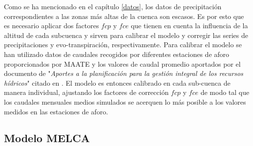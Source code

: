 Como se ha mencionado en el capítulo \ref{datos}, los datos de precipitación correspondientes a las zonas más 
altas de la cuenca son escasos. Es por esto que es necesario aplicar  dos factores $fcp$ y $fce$ 
que tienen en cuenta la influencia de la altitud de cada subcuenca y
 sirven para calibrar el modelo y corregir las series de precipitaciones y evo-transpiración, respectivamente.
 Para calibrar el modelo se han utilizado datos de caudales recogidos por diferentes estaciones de aforo proporcionados por
 MAATE \cite{MAATE} y los valores de caudal promedio aportados por el documento de "\textit{Aportes a la planificación para 
 la gestión integral de los recursos hídricos}" citado en \cite{Rodriguez}. 
 El modelo es entonces calibrado en cada sub-cuenca de manera individual, ajustando los factores de corrección $fcp$ y $fce$ 
 de modo tal que los caudales   mensuales medios  simulados se acerquen lo más posible a los valores medidos en las estaciones de aforo.
 
 
 
 
 
 
 
 



\subsection{Modelo MELCA}

